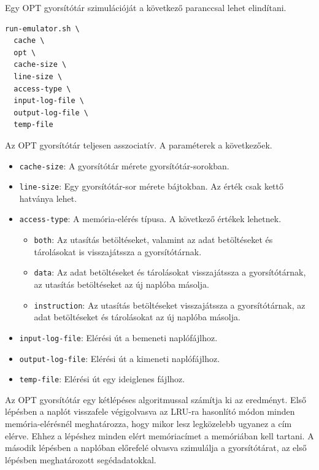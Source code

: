 \documentclass[12pt]{report}
\begin{document}
Egy OPT gyorsítótár szimulációját a következő paranccsal lehet elindítani.
\begin{verbatim}
run-emulator.sh \
  cache \
  opt \
  cache-size \
  line-size \
  access-type \
  input-log-file \
  output-log-file \
  temp-file
\end{verbatim}
Az OPT gyorsítótár teljesen asszociatív.
A paraméterek a következőek.
\begin{itemize}
\item \texttt{cache-size}: A gyorsítótár mérete gyorsítótár-sorokban.

\item \texttt{line-size}: Egy gyorsítótár-sor mérete bájtokban.
Az érték csak kettő hatványa lehet.

\item \texttt{access-type}: A memória-elérés típusa. A következő értékek lehetnek.
\begin{itemize}
\item \texttt{both}:
Az utasítás betöltéseket, valamint az adat betöltéseket és tárolásokat
is visszajátssza a gyorsítótárnak.
\item \texttt{data}:
Az adat betöltéseket és tárolásokat visszajátssza a gyorsítótárnak,
az utasítás betöltéseket az új naplóba másolja.
\item \texttt{instruction}:
Az utasítás betöltéseket visszajátssza a gyorsítótárnak,
az adat betöltéseket és tárolásokat az új naplóba másolja.
\end{itemize}

\item \texttt{input-log-file}: Elérési út a bemeneti naplófájlhoz.

\item \texttt{output-log-file}: Elérési út a kimeneti naplófájlhoz.

\item \texttt{temp-file}: Elérési út egy ideiglenes fájlhoz.
\end{itemize}
Az OPT gyorsítótár egy kétlépéses algoritmussal\cite{stack-algorithm}
számítja ki az eredményt.
Első lépésben a naplót visszafele végigolvasva az LRU-ra hasonlító
módon minden memória-elérésnél meghatározza,
hogy mikor lesz legközelebb ugyanez a cím elérve.
Ehhez a lépéshez minden elért memóriacímet a memóriában kell tartani.
A második lépésben a naplóban előrefelé olvasva
szimulálja a gyorsítótárat,
az első lépésben meghatározott segédadatokkal.
\end{document}

